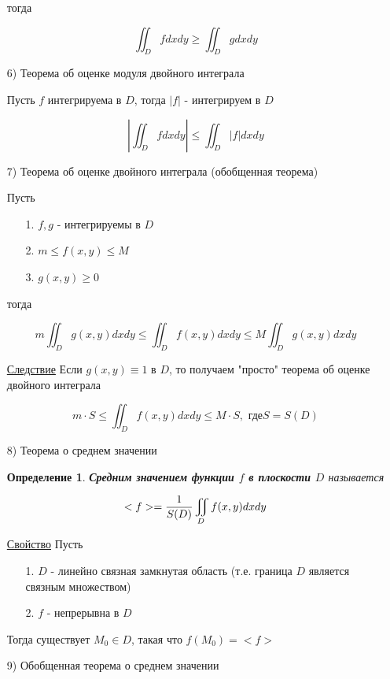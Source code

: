 \documentclass[a4paper, 14pt]{report}
\newtheorem{defenition}{Определение}[chapter]
\begin{document}
\begin{enumerate}
		тогда
		
		$$ \iint_D f dxdy \geq \iint_D g dxdy $$
		
		\item[6)] Теорема об оценке модуля двойного интеграла
		
		Пусть $f$ интегрируема в $D$, тогда $|f|$ - интегрируем в $D$
		
		$$ |\iint_D f dxdy| \le \iint_D |f| dxdy $$
		
		\item[7)] Теорема об оценке двойного интеграла (обобщенная теорема)
		
		Пусть 
		
		\begin{enumerate}
			\item[1.] $f,g$ - интегрируемы в $D$
			\item[2.] $m \le f(x,y) \le M$
			\item[3.] $g(x,y) \geq 0$
		\end{enumerate}
		
		тогда
		
		$$ m \iint_D g(x,y) dxdy \le \iint_D f(x,y) dxdy \le M \iint_D g(x,y) dxdy $$
		
		\underline{Следствие} Если $g(x,y) \equiv 1$ в $D$, то получаем "просто" теорема об оценке двойного интеграла
		
		$$ m \cdot S \le \iint_D f(x,y) dxdy \le M \cdot S, \text{ где} S = S(D)$$
		
		
		\item[8)] Теорема о среднем значении
		
            \begin{defenition}
                \textbf{Средним значением функции $f$ в плоскости $D$} называется
            \end{defenition}
		
		$$ <f> = {1 \over S(D)} \iint_D f(x,y) dxdy $$
		
		\underline{Свойство} Пусть 
		
		\begin{enumerate}
			\item[1.] $D$ - линейно связная замкнутая область (т.е. граница $D$ является связным множеством)
			\item[2.] $f$ - непрерывна в $D$
 		\end{enumerate}
		
		Тогда существует $M_0 \in D$, такая что $f(M_0) = <f>$
		
		\item[9)] Обобщенная теорема о среднем значении
		

\end{enumerate}
\end{document}
